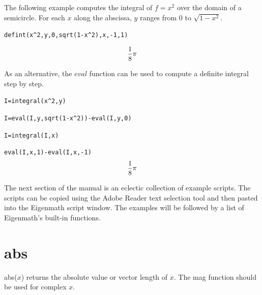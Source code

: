 \documentclass[11pt]{article}
\begin{document}
\medskip
\noindent
The following example computes the integral of $f=x^2$
over the domain of a semicircle.
For each $x$ along the abscissa, $y$ ranges from 0 to $\sqrt{1-x^2}$.

\medskip
\verb$defint(x^2,y,0,sqrt(1-x^2),x,-1,1)$

$${1\over8}\pi$$

\medskip
\noindent
As an alternative, the $eval$ function can be used to compute a definite integral step by step.

\medskip
\verb$I=integral(x^2,y)$

\verb$I=eval(I,y,sqrt(1-x^2))-eval(I,y,0)$

\verb$I=integral(I,x)$

\verb$eval(I,x,1)-eval(I,x,-1)$
$${1\over8}\pi$$











\newpage



\newpage



\newpage

\noindent
The next section of the manual is an eclectic collection of
example scripts.
The scripts can be copied using the Adobe Reader text selection tool and then
pasted into the Eigenmath script window.
The examples will be followed by a list of Eigenmath's
built-in functions.

\newpage












\newpage


\section*{abs}
abs($x$) returns the absolute value or vector length of $x$.
The mag function should be used for complex $x$.
\end{document}
